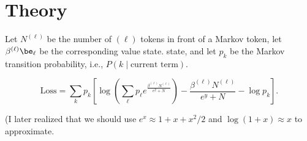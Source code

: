 \section{Theory}
Let \( N^{(\ell)} \) be the number of $(\ell)$ tokens in front of a Markov token, let \( \beta^{(\ell)} \be_{\ell} \) be the corresponding value state. 
state, and let \( p_{k} \) be the Markov transition probability, i.e., $P( k \mid \text{current term})$.

\[
\text{Loss} = \sum_k p_k \left[ \log \left( \sum_{\ell} p_\ell e^{\frac{\beta^{(\ell)}N^{(\ell)}}{e^y+N}}\right) - \frac{\beta^{(\ell)}N^{(\ell)}}{e^y+N} - \log p_k\right].
\]

(I later realized that we should use $e^x\approx 1+x+x^2/2$ and $\log(1+x)\approx x$ to approximate.